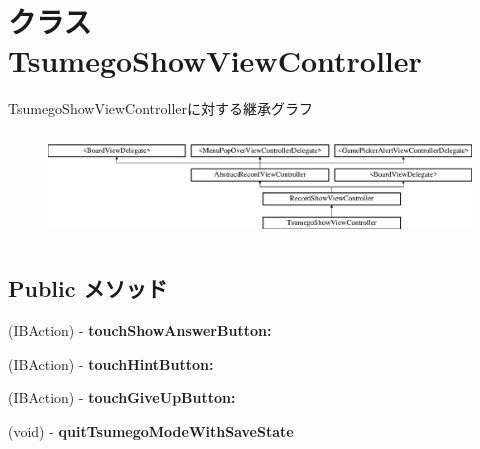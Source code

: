 \hypertarget{interface_tsumego_show_view_controller}{
\section{クラス TsumegoShowViewController}
\label{interface_tsumego_show_view_controller}
}
TsumegoShowViewControllerに対する継承グラフ\begin{figure}[H]
\begin{center}
\leavevmode
\includegraphics[height=2.839037cm]{interface_tsumego_show_view_controller}
\end{center}
\end{figure}
\subsection*{Public メソッド}
\begin{DoxyCompactItemize}
\item 
\hypertarget{interface_tsumego_show_view_controller_a7c668d88ecb8960ee6745bf8c9feb60e}{
(IBAction) -\/ {\bfseries touchShowAnswerButton:}}
\label{interface_tsumego_show_view_controller_a7c668d88ecb8960ee6745bf8c9feb60e}

\item 
\hypertarget{interface_tsumego_show_view_controller_ac089534bb2c7c5bafdd8ee65b0f73fe4}{
(IBAction) -\/ {\bfseries touchHintButton:}}
\label{interface_tsumego_show_view_controller_ac089534bb2c7c5bafdd8ee65b0f73fe4}

\item 
\hypertarget{interface_tsumego_show_view_controller_adc9b53bd0ee2ebb1cf8ff5a7ac04d77c}{
(IBAction) -\/ {\bfseries touchGiveUpButton:}}
\label{interface_tsumego_show_view_controller_adc9b53bd0ee2ebb1cf8ff5a7ac04d77c}

\item 
\hypertarget{interface_tsumego_show_view_controller_a7c0d8943ba37e394bed7a01464e2dc81}{
(void) -\/ {\bfseries quitTsumegoModeWithSaveState}}
\label{interface_tsumego_show_view_controller_a7c0d8943ba37e394bed7a01464e2dc81}

\end{DoxyCompactItemize}
